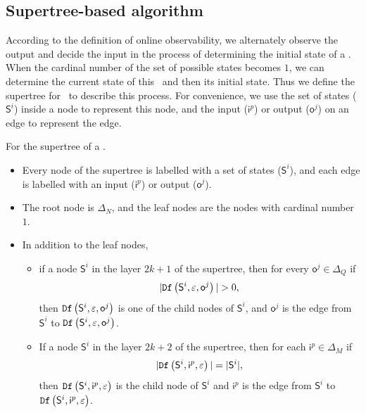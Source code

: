 \subsection{Supertree-based algorithm} %
According to the definition of online observability, we alternately observe the output and decide the input in the process of determining the initial state of a \BCN. When the cardinal number of the set of possible states becomes $1$, we can determine the current state of this \BCN\ and then its initial state. Thus we define the supertree for \BCNs\ to describe this process. For convenience, we use the set of states ($\mathsf{S}^i$) inside a node to represent this node, and the input ($\mathsf{i}^p$) or output ($\mathsf{o}^j$) on an edge to represent the edge.
\begin{definition}[Supertree]
For the supertree of a \BCN.   
\begin{itemize}
 \item  Every node of the supertree is labelled with a set of states ($\mathsf{S}^i$), and each edge is labelled with an input ($\mathsf{i}^p$) or output ($\mathsf{o}^j$).
 \item  The root node is $\Delta_N$, and the leaf nodes are the nodes with cardinal number $1$.%
 \item In addition to the leaf nodes, 
 \begin{itemize}
 \item if a node $\mathsf{S}^i$ in the layer $2k + 1$ of the supertree, then for every $\mathsf{o}^j\in \Delta_Q$ if
\[|\Ded\left(\mathsf{S}^i,\varepsilon, \mathsf{o}^j\right)|>0,\]
 then ${\tt Df}\left(\mathsf{S}^i,\varepsilon, \mathsf{o}^j\right)$ is one of the child nodes of $\mathsf{S}^i$, and $\mathsf{o}^j$ is the edge from $\mathsf{S}^i$ to ${\tt Df}\left(\mathsf{S}^i,\varepsilon, \mathsf{o}^j\right)$.
 \item If a node $\mathsf{S}^i$ in the layer $2k+2$ of the supertree, then for each $\mathsf{i}^p \in \Delta_M$ if
\[|{\tt Df}\left(\mathsf{S}^i,\mathsf{i}^p,\varepsilon\right)|=|\mathsf{S}^i|,\] 
then ${\tt Df}\left(\mathsf{S}^i,\mathsf{i}^p,\varepsilon\right)$ is the child node of $\mathsf{S}^i$ and $\mathsf{i}^p$ is the edge from $\mathsf{S}^i$ to ${\tt Df}\left(\mathsf{S}^i,\mathsf{i}^p,\varepsilon\right)$. 
 \end{itemize}
 
  
 \end{itemize}
\label{def:super-tree}
\end{definition}

